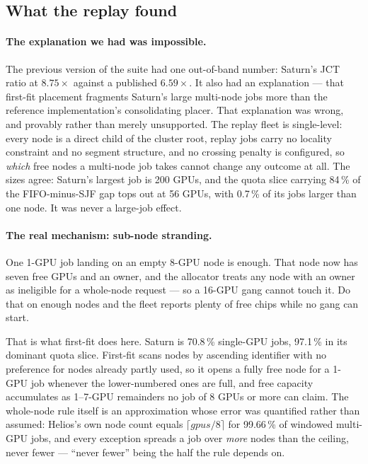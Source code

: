 \subsection{What the replay found}
\label{sec:replay-found}

\paragraph{The explanation we had was impossible.}
The previous version of the suite had one out-of-band number: Saturn's JCT ratio
at $8.75\times$ against a published $6.59\times$. It also had an explanation ---
that first-fit placement fragments Saturn's large multi-node jobs more than the
reference implementation's consolidating placer. That explanation was wrong, and
provably rather than merely unsupported. The replay fleet is single-level: every
node is a direct child of the cluster root, replay jobs carry no locality
constraint and no segment structure, and no crossing penalty is configured, so
\emph{which} free nodes a multi-node job takes cannot change any outcome at all.
The sizes agree: Saturn's largest job is 200 GPUs, and the quota slice carrying
84\,\% of the FIFO-minus-SJF gap tops out at 56 GPUs, with 0.7\,\% of its jobs
larger than one node. It was never a large-job effect.

\paragraph{The real mechanism: sub-node stranding.}
One 1-GPU job landing on an empty 8-GPU node is enough. That node now has seven
free GPUs and an owner, and the allocator treats any node with an owner as
ineligible for a whole-node request --- so a 16-GPU gang cannot touch it. Do
that on enough nodes and the fleet reports plenty of free chips while no gang
can start.

That is what first-fit does here. Saturn is 70.8\,\% single-GPU jobs, 97.1\,\%
in its dominant quota slice. First-fit scans nodes by ascending identifier with
no preference for nodes already partly used, so it opens a fully free node for a
1-GPU job whenever the lower-numbered ones are full, and free capacity
accumulates as 1--7-GPU remainders no job of 8 GPUs or more can claim. The
whole-node rule itself is an approximation whose error was quantified rather
than assumed: Helios's own node count equals $\lceil \mathit{gpus}/8 \rceil$ for
99.66\,\% of windowed multi-GPU jobs, and every exception spreads a job over
\emph{more} nodes than the ceiling, never fewer --- ``never fewer'' being the
half the rule depends on.

